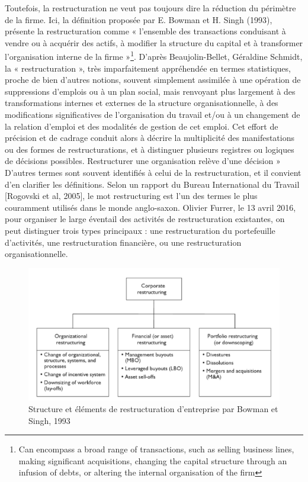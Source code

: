 \documentclass[12pt,a4paper]{article}
\begin{document}
Toutefois, la restructuration ne veut pas toujours dire la réduction du périmètre de la firme. Ici, la définition proposée par E. Bowman et H. Singh (1993), présente la restructuration comme « l'ensemble des transactions conduisant à vendre ou à acquérir des actifs, à modifier la structure du capital et à transformer l'organisation interne de la firme »\footnote{Can encompass a broad range of transactions, such as selling business lines, making significant acquisitions, changing the capital structure through an infusion of debts, or altering the internal organisation of the firm}. D'après Beaujolin-Bellet,  Géraldine Schmidt, la « restructuration », très imparfaitement appréhendée en termes statistiques, proche de bien d’autres notions, souvent simplement assimilée à une opération de suppressions d’emplois ou à un plan social, mais renvoyant plus largement à des transformations internes et externes de la structure organisationnelle, à des modifications significatives de l’organisation du travail et/ou à un changement de la relation d’emploi et des modalités de gestion de cet emploi. Cet effort de précision et de cadrage conduit alors à décrire la multiplicité des manifestations ou des formes de restructurations, et à distinguer plusieurs registres ou logiques de décisions possibles. Restructurer une organisation relève d’une décision »\\
 
D’autres termes sont souvent identifiés à celui de la restructuration, et il convient d’en clarifier les définitions. Selon un rapport du Bureau International du Travail [Rogovski et al, 2005], le mot restructuring est l'un des termes le plus couramment utilisés dans le monde anglo-saxon. Olivier Furrer, le 13 avril 2016, pour organiser le large éventail des activités de restructuration existantes, on peut distinguer trois types principaux : une restructuration du portefeuille d’activités, une restructuration financière, ou une restructuration organisationnelle. \\
\newpage
\begin{figure}[h!]
\centering
\includegraphics[scale=1]{restructuration}
\caption{Structure et éléments de restructuration d'entreprise par Bowman et Singh, 1993}
\label{fig:graph}
\end{figure}
 
\end{document}
